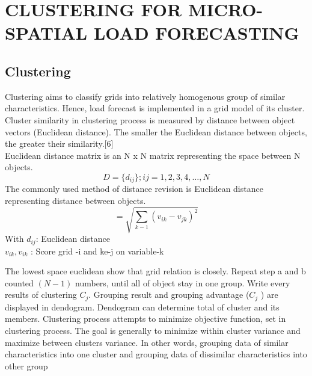 \documentclass[conference]{IEEEtran}
\begin{document}
{%

\section{CLUSTERING FOR MICRO-SPATIAL LOAD FORECASTING}
\subsection{Clustering}
Clustering aims to classify grids into relatively homogenous group of similar characteristics. Hence, load forecast is implemented in a grid model of its cluster. Cluster similarity in clustering process is measured by distance between object vectors (Euclidean distance). The smaller the Euclidean distance between objects, the greater their similarity.[6] 
\\Euclidean distance matrix is an N x N matrix representing the space between N objects.
\begin{equation}\label{eq:3}
    D=\{d_{ij}\}; ij=1,2,3,4,\dots,N
\end{equation}
The commonly used method of distance revision is Euclidean distance representing distance between objects.
\begin{equation} \label{eq:4}
    =\sqrt{\sum_{k-1}(v_{ik}-v_{jk})^2}
\end{equation}
With 
$d_{ij}$\hspace*{8mm}: Euclidean distance\\
\hspace*{7.5mm}  $v_{ik},v_{ik} $        : Score grid -i and ke-j on variable-k

The lowest space euclidean show that grid relation is closely. Repeat step a and b counted $(N-1)$ numbers, until all of object stay in one group. Write every results of clustering $C_{j}$. Grouping result and grouping advantage ($C_{j}$ ) are displayed in dendogram. Dendogram can determine total of cluster and its members. Clustering process attempts to minimize objective function, set in clustering process. The goal is generally to minimize within cluster variance and maximize between clusters variance. In other words, grouping data of similar characteristics into one cluster and grouping data of dissimilar characteristics into other group
}
\end{document}
